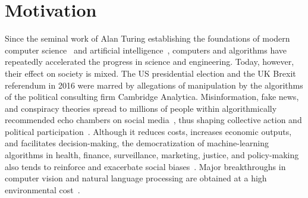 \section{Motivation}
\label{in:sec:motivation}

Since the seminal work of Alan Turing establishing the foundations of modern computer science~\citep{turing1937computable} and artificial intelligence~\citep{turing2009computing}, computers and algorithms have repeatedly accelerated the progress in science and engineering.
Today, however, their effect on society is mixed.
The US presidential election and the UK Brexit referendum in 2016 were marred by allegations of manipulation by the algorithms of the political consulting firm Cambridge Analytica.
Misinformation, fake news, and conspiracy theories spread to millions of people within algorithmically recommended echo chambers on social media~\citep{kumar2016disinformation,garimella2018political,ribeiro2020auditing,cinelli2021echo}, thus shaping collective action and political participation~\citep{margetts2015political}.
Although it reduces costs, increases economic outputs, and facilitates decision-making, the democratization of machine-learning algorithms in health, finance, surveillance, marketing, justice, and policy-making also tends to reinforce and exacerbate social biases~\citep{hajian2016algorithmic,stoica2018algorithmic,rodolfa2020case}.
Major breakthroughs in computer vision and natural language processing are obtained at a high environmental cost~\citep{strubell2019energy}.

